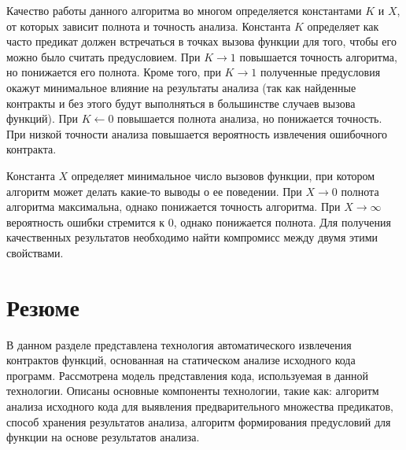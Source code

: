 Качество работы данного алгоритма во многом определяется константами $K$ и $X$, от которых зависит полнота и точность анализа. Константа $K$ определяет как часто предикат должен встречаться в точках вызова функции для того, чтобы его можно было считать предусловием. При $K \to 1$ повышается точность алгоритма, но понижается его полнота. Кроме того, при $K \to 1$ полученные предусловия окажут минимальное влияние на результаты анализа (так как найденные контракты и без этого будут выполняться в большинстве случаев вызова функций). При $K \leftarrow 0$ повышается полнота анализа, но понижается точность. При низкой точности анализа повышается вероятность извлечения ошибочного контракта. 

Константа $X$ определяет минимальное число вызовов функции, при котором алгоритм может делать какие-то выводы о ее поведении. При $X \to 0$ полнота алгоритма максимальна, однако  понижается точность алгоритма. При $X \to \infty$ вероятность ошибки стремится к 0, однако понижается полнота. Для получения качественных результатов необходимо найти компромисс между двумя этими свойствами.

\section{Резюме}
В данном разделе представлена технология автоматического извлечения контрактов функций, основанная на статическом анализе исходного кода программ. Рассмотрена модель представления кода, используемая в данной технологии. Описаны основные компоненты технологии, такие как: алгоритм анализа исходного кода для выявления предварительного множества предикатов, способ хранения результатов анализа, алгоритм формирования предусловий для функции на основе результатов анализа.